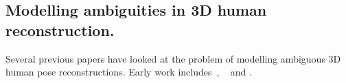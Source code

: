 


\subsection{Modelling ambiguities in 3D human reconstruction.}

Several previous papers have looked at the problem of modelling ambiguous 3D human pose reconstructions. Early work includes~\citet{kinematic-jump-processes}, ~\citet{tracking-3d-human-figures} and \citet{density-prop}. 


